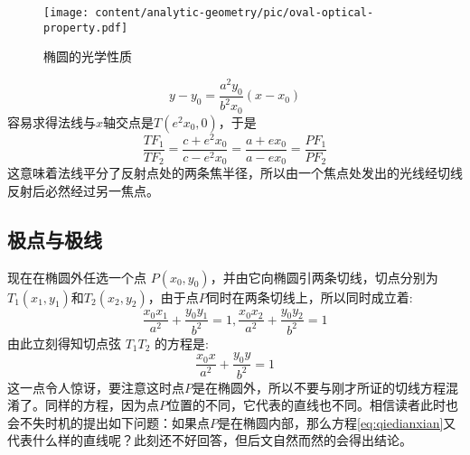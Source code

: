 \begin{figure}[htbp]
  \centering
\texttt{[image: content/analytic-geometry/pic/oval-optical-property.pdf]}
\caption{椭圆的光学性质}
\label{fig:oval-optical-property}
\end{figure}

\begin{equation*}
y-y_0=\frac{a^2y_0}{b^2x_0}(x-x_0)
\end{equation*}
容易求得法线与$x$轴交点是$T(e^2x_0,0)$，于是
\begin{equation*}
  \frac{TF_1}{TF_2}=\frac{c+e^2x_0}{c-e^2x_0}=\frac{a+ex_0}{a-ex_0}=\frac{PF_1}{PF_2}
\end{equation*}
这意味着法线平分了反射点处的两条焦半径，所以由一个焦点处发出的光线经切线反射后必然经过另一焦点。

\subsection{极点与极线}
\label{sec:oval-polor-point-and-polor-line}

现在在椭圆外任选一个点 $P(x_0,y_0)$，并由它向椭圆引两条切线，切点分别为 $T_1(x_1,y_1)$和$T_2(x_2,y_2)$，由于点$P$同时在两条切线上，所以同时成立着:
\begin{equation}
\frac{x_0 x_1}{a^2}+\frac{y_0 y_1}{b^2} = 1,\frac{x_0 x_2}{a^2}+\frac{y_0 y_2}{b^2} = 1
\end{equation}
由此立刻得知切点弦 $T_1 T_2$ 的方程是:
\begin{equation}
\frac{x_0x}{a^2}+\frac{y_0y}{b^2}=1   \label{eq:qiedianxian}
\end{equation}
这一点令人惊讶，要注意这时点$P$是在椭圆外，所以不要与刚才所证的切线方程混淆了。同样的方程，因为点$P$位置的不同，它代表的直线也不同。相信读者此时也会不失时机的提出如下问题：如果点$P$是在椭圆内部，那么方程\ref{eq:qiedianxian}又代表什么样的直线呢？此刻还不好回答，但后文自然而然的会得出结论。

